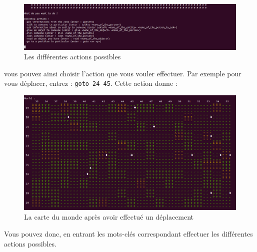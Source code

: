 \documentclass[asi]{picINSA}
\begin{document}
\begin{figure}[!ht]
  \begin{center}
    \includegraphics[width=1\textwidth]{images/screenshootUI01.png}
    \caption{Les différentes actions possibles}	
  \end{center}
\end{figure}
 vous pouvez ainsi choisir l'action que vous vouler effectuer. Par exemple pour vous déplacer, entrez : \verb+goto 24 45+. Cette action donne :
\begin{figure}[!ht]
  \begin{center}
    \includegraphics[width=1\textwidth]{images/screenshootCarte02.png}
    \caption{La carte du monde après avoir effectué un déplacement}	
  \end{center}
\end{figure}

Vous pouvez donc, en entrant les mots-clés correspondant effectuer les différentes actions possibles.
\end{document}
